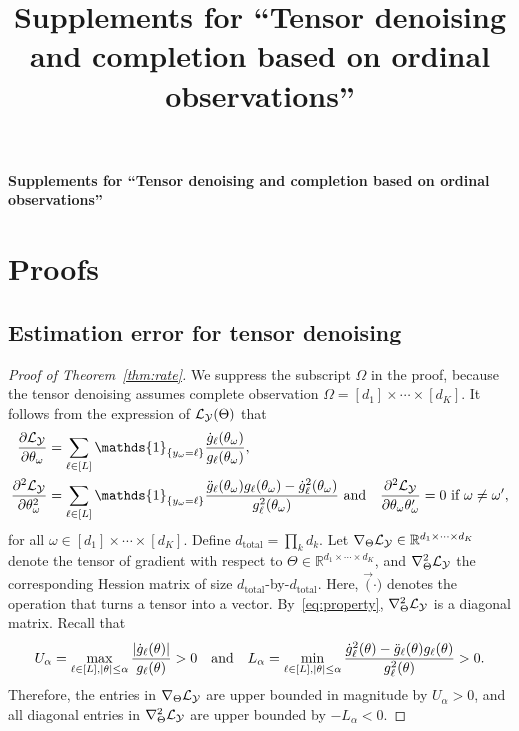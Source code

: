 \documentclass[11pt]{article}
\title{Supplements for ``Tensor denoising and completion based on ordinal observations''}
\theoremstyle{plain}
\theoremstyle{definition}
\begin{document}
\begin{center}
\begin{spacing}{1.5}
\textbf{\Large Supplements for ``Tensor denoising and completion based on ordinal observations''}
\end{spacing}
\end{center}

\section{Proofs}
\subsection{Estimation error for tensor denoising}
\begin{proof}[Proof of Theorem~\ref{thm:rate}]
We suppress the subscript $\Omega$ in the proof, because the tensor denoising assumes complete observation $\Omega=[d_1]\times \cdots \times [d_K]$. It follows from the expression of $\mathcal{L}_{\mathcal{Y}}(\Theta)$ that
\begin{align}\label{eq:property}
{\partial \flogl\over \partial \theta_\omega}&=\sum_{\ell\in[L]}\mathds{1}_{\{y_{\omega}=\ell\}}
{\dot{g}_\ell(\theta_\omega)\over g_\ell(\theta_\omega)},\notag\\
{\partial^2 \flogl\over \partial \theta_\omega^2}&=\sum_{\ell\in[L]}\mathds{1}_{\{y_\omega=\ell\}}{\ddot{g}_\ell(\theta_\omega)g_\ell(\theta_\omega)-\dot{g}^2_\ell(\theta_\omega)\over g^2_\ell(\theta_\omega)}\ \text{and}\quad
{\partial^2 \flogl\over \partial \theta_\omega \theta_\omega'}=0\ \text{if}\ \omega\neq \omega',
\end{align}
for all $\omega\in[d_1]\times \cdots \times [d_K]$.
Define $d_{\text{total}}=\prod_k d_k$. Let $\nabla_{\Theta}\mathcal{L}_{\mathcal{Y}}\in\mathbb{R}^{d_1\times\cdots\times d_K}$ denote the tensor of gradient with respect to $\Theta\in\mathbb{R}^{d_1\times \cdots\times d_K}$, and $\nabla^2_{\Theta}\mathcal{L}_{\mathcal{Y}}$ the corresponding Hession matrix of size $d_\text{total}$-by-$d_{\text{total}}$. Here, $\Vec(\cdot)$ denotes the operation that turns a tensor into a vector. By~\eqref{eq:property}, $\nabla^2_{\Theta}\mathcal{L}_{\mathcal{Y}}$ is a diagonal matrix. Recall that
\begin{equation}\label{eq:bound}
U_\alpha=\max_{\ell\in[L],|\theta|\leq \alpha}{|\dot{g}_\ell(\theta)|\over g_\ell(\theta)}>0 \quad \text{and}\quad
L_\alpha=\min_{\ell\in[L],|\theta|\leq \alpha} {\dot{g}^2_\ell(\theta)-\ddot{g}_\ell(\theta)g_\ell(\theta)\over g^2_\ell(\theta)}>0.
\end{equation}
Therefore, the entries in $\nabla_{\Theta}\mathcal{L}_{\mathcal{Y}}$ are upper bounded in magnitude by $U_\alpha>0$, and all diagonal entries in $\nabla^2_{\Theta}\mathcal{L}_{\mathcal{Y}}$ are upper bounded by $-L_{\alpha}<0$.


\end{proof}
\end{document}
